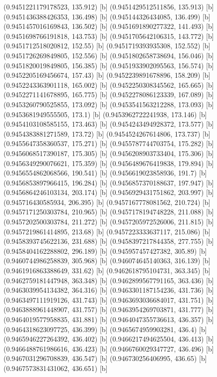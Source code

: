 {{{(0.9451221179178523, 135.912) [b] 
(0.9451429512511856, 135.913) [b] 
(0.9451436388426353, 136.498) [b] 
(0.945144326434085, 136.499) [b] 
(0.9451457016169843, 136.502) [b] 
(0.9451691890277322, 141.493) [b] 
(0.9451698766191818, 143.753) [b] 
(0.9451705642106315, 143.772) [b] 
(0.9451712518020812, 152.55) [b] 
(0.9451719393935308, 152.552) [b] 
(0.9451726269849805, 152.556) [b] 
(0.9451802658738694, 156.046) [b] 
(0.9451820019849805, 156.385) [b] 
(0.9451933902095563, 156.574) [b] 
(0.9452205169456674, 157.43) [b] 
(0.9452239891678896, 158.209) [b] 
(0.9452243363901118, 165.002) [b] 
(0.9452250308345562, 165.665) [b] 
(0.9452271141678895, 165.775) [b] 
(0.9452278086123339, 167.089) [b] 
(0.9453260790525855, 173.092) [b] 
(0.9453541563212288, 173.093) [b] 
(0.9453681949555505, 173.1) [b] 
(0.9453962722241938, 173.146) [b] 
(0.9454103108585155, 173.463) [b] 
(0.9454243494928372, 173.577) [b] 
(0.9454383881271589, 173.72) [b] 
(0.9454524267614806, 173.737) [b] 
(0.9455647358360537, 175.271) [b] 
(0.9455787744703754, 175.282) [b] 
(0.9456068517390187, 175.305) [b] 
(0.9456208903733404, 175.306) [b] 
(0.9456349290076621, 175.359) [b] 
(0.9456489676419838, 179.894) [b] 
(0.9456554862068566, 190.541) [b] 
(0.9456619023858936, 191.7) [b] 
(0.9456853897966415, 196.284) [b] 
(0.9456857370188637, 197.947) [b] 
(0.9456864246103134, 203.174) [b] 
(0.9456929431751862, 203.997) [b] 
(0.945716430585934, 206.395) [b] 
(0.9457167778081562, 210.724) [b] 
(0.9457171250303784, 210.965) [b] 
(0.9457178194748228, 211.088) [b] 
(0.9457202500303784, 211.272) [b] 
(0.9457205972526006, 211.815) [b] 
(0.9457219861414895, 213.68) [b] 
(0.9457223333637117, 215.086) [b] 
(0.9458393745622136, 231.688) [b] 
(0.9458397217844358, 277.755) [b] 
(0.9458404162288802, 296.189) [b] 
(0.945957457427382, 305.89) [b] 
(0.9460744986258839, 305.968) [b] 
(0.946074645140363, 316.139) [b] 
(0.9461916863388649, 331.62) [b] 
(0.9462618795104731, 363.345) [b] 
(0.9462759181447948, 363.348) [b] 
(0.9462899567791165, 363.436) [b] 
(0.9463039954134382, 364.316) [b] 
(0.9463301187154236, 431.736) [b] 
(0.9463497111919126, 431.743) [b] 
(0.9463693036684017, 431.751) [b] 
(0.9463888961448907, 431.757) [b] 
(0.9463954269703871, 431.777) [b] 
(0.9464019577958835, 431.881) [b] 
(0.9464047355736613, 436.357) [b] 
(0.9464318623097725, 436.399) [b] 
(0.9465674959903281, 436.4) [b] 
(0.9465946227264392, 436.402) [b] 
(0.9466217494625504, 436.413) [b] 
(0.9466488761986616, 436.423) [b] 
(0.9466760029347727, 436.496) [b] 
(0.9467031296708839, 436.547) [b] 
(0.946730256406995, 436.65) [b] 
(0.9467573831431062, 436.651) [b] 
}}}
